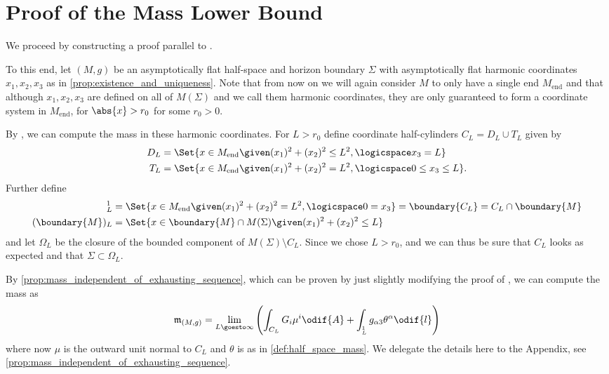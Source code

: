 \documentclass[titlepage,numbers=noenddot,headinclude,oneside,%
footinclude=true,cleardoublepage=empty,%
BCOR=5mm,paper=a4,fontsize=11pt,%
english,%
]{scrartcl}
\let\sphere\relax
\newcommand{\sphere}{\mathbb{S}}
\newcommand{\Mend}{M_{\mathrm{end}}} %
\newcommand{\mass}[2]{\mathfrak{m}_{(#1,#2)}} %
\begin{document}
\section{Proof of the Mass Lower Bound}
We proceed by constructing a proof parallel to \cite[Section 6]{brayHarmonicFunctionsMass2019}.%

To this end, let \( (M,g) \) be an asymptotically flat half-space and horizon boundary \( \Sigma \) with asymptotically flat harmonic coordinates \( x_1,x_2,x_3 \) as in \cref{prop:existence_and_uniqueness}. Note that from now on we will again consider \( M \) to only have a single end \( \Mend \) and that although \( x_1,x_2,x_3 \) are defined on all of \( M(\Sigma) \) and we call them harmonic coordinates, they are only guaranteed to form a coordinate system in \( \Mend \), \ie for \( \abs{x}>r_0 \) for some \( r_0>0 \).

By \cite[Proposition 3.7]{almarazPositiveMassTheorem2016}, we can compute the mass in these harmonic coordinates. For \( L>r_0 \) define coordinate half-cylinders \( C_L=D_L\cup T_L \) given by
\begin{align*}
    D_L&=\Set{x\in \Mend\given (x_1)^2+(x_2)^2\leq L^2,\logicspace x_3=L}\\
    T_L&=\Set{x\in \Mend\given (x_1)^2+(x_2)^2=L^2,\logicspace 0\leq x_3\leq L}.
\end{align*}
Further define
\begin{align*}
    \sphere_L^1&=\Set{x\in \Mend \given (x_1)^2+(x_2)^2=L^2,\logicspace 0=x_3}=\boundary{C_L}=C_L\cap \boundary{M}\\
    (\boundary{M})_L&=\Set{x\in \boundary{M}\cap M(\Sigma)\given (x_1)^2+(x_2)^2\leq L}
\end{align*}
and let \( \Omega_L \) be the closure of the bounded component of \( M(\Sigma)\setminus C_L \). Since we chose \( L>r_0 \), and we can thus be sure that \( C_L  \) looks as expected and that \( \Sigma\subset \Omega_L \).

By \cref{prop:mass_independent_of_exhausting_sequence}, which can be proven by just slightly modifying the proof of \cite[Proposition 3.7]{almarazPositiveMassTheorem2016}, we can compute the mass as
\begin{equation*}
    \mass{M}{g}=\lim_{L \goesto \infty}\left( \int_{C_L}G_i  \mu^i\odif{A}+\int_{\sphere^1_L}g_{\alpha 3}\theta^\alpha\odif{l} \right)
\end{equation*}
where now \( \mu \) is the outward unit normal to \( C_L \) and \( \theta \) is as in \cref{def:half_space_mass}. We delegate the details here to the Appendix, see \cref{prop:mass_independent_of_exhausting_sequence}.
\end{document}
